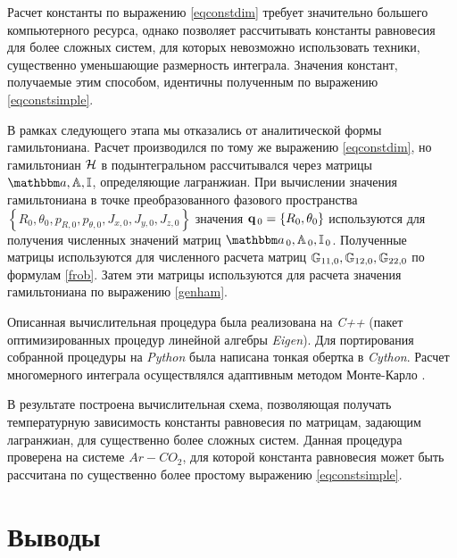 Расчет константы по выражению \eqref{eqconstdim} требует значительно большего компьютерного ресурса, однако позволяет рассчитывать константы равновесия для более сложных систем, для которых невозможно использовать техники, существенно уменьшающие размерность интеграла. Значения констант, получаемые этим способом, идентичны полученным по выражению \eqref{eqconstsimple}. \par 
В рамках следующего этапа мы отказались от аналитической формы гамильтониана. Расчет производился по тому же выражению \eqref{eqconstdim}, но гамильтониан $\mathcal{H}$ в подынтегральном рассчитывался через матрицы $\bba, \bbA, \bbI$, определяющие лагранжиан. При вычислении значения гамильтониана в точке преобразованного фазового пространства $\left\{ R_0, \theta_0, p_{R, 0}, p_{\theta, 0}, J_{x, 0}, J_{y, 0}, J_{z, 0} \right\}$ значения $\mathbf{q}_{\, 0} = \left\{ R_0, \theta_0 \right\}$ используются для получения численных значений матриц $\bba_{\, 0}, \bbA_{\, 0}, \bbI_{\, 0}$. Полученные матрицы используются для численного расчета матриц $\mathbb{G}_{11, 0}, \mathbb{G}_{12, 0}, \mathbb{G}_{22, 0}$ по формулам \eqref{frob}. Затем эти матрицы используются для расчета значения гамильтониана по выражению \eqref{genham}. \par
Описанная вычислительная процедура была реализована на \textit{C++} (пакет оптимизированных процедур линейной алгебры \textit{Eigen}). Для портирования собранной процедуры на \textit{Python} была написана тонкая обертка в \textit{Cython}. Расчет многомерного интеграла осуществлялся адаптивным методом Монте-Карло \cite{lepage1978, vegas}. \par 
В результате построена вычислительная схема, позволяющая получать температурную зависимость константы равновесия по матрицам, задающим лагранжиан, для существенно более сложных систем. Данная процедура проверена на системе $Ar-CO_2$, для которой константа равновесия может быть рассчитана по существенно более простому выражению \eqref{eqconstsimple}.   

\section{Выводы}


